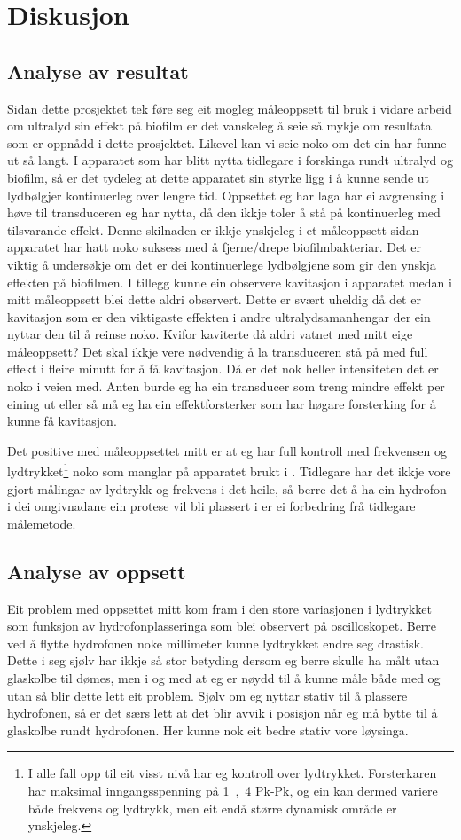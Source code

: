\section{Diskusjon}
\subsection{Analyse av resultat}
Sidan dette prosjektet tek føre seg eit mogleg måleoppsett til bruk i vidare arbeid om ultralyd sin effekt på biofilm er det vanskeleg å seie så mykje om resultata som er oppnådd i dette prosjektet. Likevel kan vi seie noko om det ein har funne ut så langt. I apparatet som har blitt nytta tidlegare i forskinga rundt ultralyd og biofilm, så er det tydeleg at dette apparatet sin styrke ligg i å kunne sende ut lydbølgjer kontinuerleg over lengre tid. Oppsettet eg har laga har ei avgrensing i høve til transduceren eg har nytta, då den ikkje toler å stå på kontinuerleg med tilsvarande effekt. Denne skilnaden er ikkje ynskjeleg i et måleoppsett sidan apparatet har hatt noko suksess med å fjerne/drepe biofilmbakteriar. Det er viktig å undersøkje om det er dei kontinuerlege lydbølgjene som gir den ynskja effekten på biofilmen. I tillegg kunne ein observere kavitasjon i apparatet medan i mitt måleoppsett blei dette aldri observert. Dette er svært uheldig då det er kavitasjon som er den viktigaste effekten i andre ultralydsamanhengar der ein nyttar den til å reinse noko. Kvifor kaviterte då aldri vatnet med mitt eige måleoppsett? Det skal ikkje vere nødvendig å la transduceren stå på med full effekt i fleire minutt for å få kavitasjon. Då er det nok heller intensiteten det er noko i veien med. Anten burde eg ha ein transducer som treng mindre effekt per eining ut eller så må eg ha ein effektforsterker som har høgare forsterking for å kunne få kavitasjon.

Det positive med måleoppsettet mitt er at eg har full kontroll med frekvensen og lydtrykket\footnote{I alle fall opp til eit visst nivå har eg kontroll over lydtrykket. Forsterkaren har maksimal inngangsspenning på \unit{1,4}{\volt} Pk-Pk, og ein kan dermed variere både frekvens og lydtrykk, men eit endå større dynamisk område er ynskjeleg.} noko som manglar på apparatet brukt i \cite{ultraprotese}. Tidlegare har det ikkje vore gjort målingar av lydtrykk og frekvens i det heile, så berre det å ha ein hydrofon i dei omgivnadane ein protese vil bli plassert i er ei forbedring frå tidlegare målemetode.
\subsection{Analyse av oppsett}
Eit problem med oppsettet mitt kom fram i den store variasjonen i lydtrykket som funksjon av hydrofonplasseringa som blei observert på oscilloskopet. Berre ved å flytte hydrofonen noke millimeter kunne lydtrykket endre seg drastisk. Dette i seg sjølv har ikkje så stor betyding dersom eg berre skulle ha målt utan glaskolbe til dømes, men i og med at eg er nøydd til å kunne måle både med og utan så blir dette lett eit problem. Sjølv om eg nyttar stativ til å plassere hydrofonen, så er det særs lett at det blir avvik i posisjon når eg må bytte til å glaskolbe rundt hydrofonen. Her kunne nok eit bedre stativ vore løysinga.

